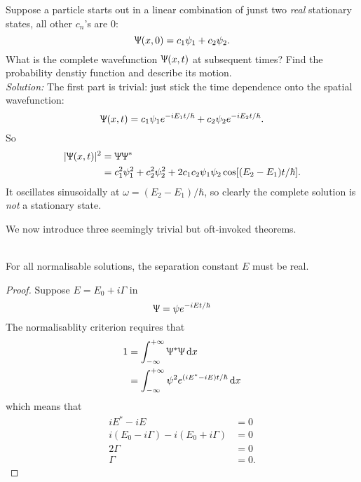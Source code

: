\begin{wex}
Suppose a particle starts out in a linear combination of junst two \textit{real} stationary states, \ie all other $c_n$'s are $0$:
\begin{equation}
\Uppsi(x,0)=c_1\psi_1+c_2\psi_2. 
\end{equation}
What is the complete wavefunction $\Uppsi(x,t)$ at subsequent times? Find the probability denstiy function and describe its motion.\\
\textit{Solution: }The first part is trivial: just stick the time dependence onto the spatial wavefunction:
\begin{equation}
\Uppsi(x,t)=c_1\psi_1e^{-iE_1t/\hbar}+c_2\psi_2e^{-iE_2t/\hbar}. 
\end{equation}
So
\begin{subequations}
\begin{align}
|\Uppsi(x,t)|^2&=\Uppsi\Uppsi^* \\
&=c_1^2\psi_1^2+c_2^2\psi_2^2+2c_1c_2\psi_1\psi_2\cos[(E_2-E_1)t/\hbar].
\end{align}
\end{subequations}
It oscillates sinusoidally at $\omega=(E_2-E_1)/\hbar$, so clearly the complete solution is \textit{not} a stationary state. 
\end{wex}
We now introduce three seemingly trivial but oft-invoked theorems. 
\begin{thrm}
\ \\
For all normalisable solutions, the separation constant $E$ must be real. 
\end{thrm}
\begin{proof}
Suppose $E=E_0+i\Gamma$ in
\begin{equation}
\Uppsi=\psi e^{-iEt/\hbar}
\end{equation}
The normalisablity criterion requires that
\begin{subequations}
\begin{align}
1&=\intinf\ups^*\ups\dx \\
&=\intinf\psi^2e^{(iE^*-iE)t/\hbar}\dx
\end{align}
\end{subequations}
which means that 
\begin{subequations}
\begin{align}
iE^*-iE&=0 \\
i(E_0-i\Gamma)-i(E_0+i\Gamma)&=0 \\
2\Gamma&=0\\
\Gamma&=0.
\end{align}
\end{subequations}
\end{proof}
